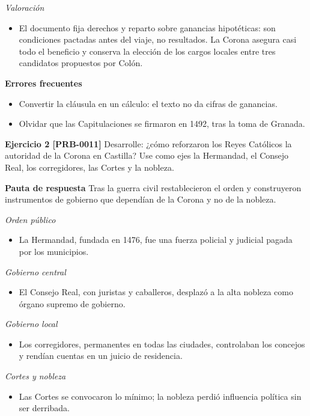 \documentclass{book}
\begin{document}
\noindent\textit{Valoración}
\begin{itemize}
\item El documento fija derechos y reparto sobre ganancias hipotéticas: son condiciones pactadas antes del viaje, no resultados. La Corona asegura casi todo el beneficio y conserva la elección de los cargos locales entre tres candidatos propuestos por Colón.
\end{itemize}

\noindent\textbf{Errores frecuentes}
\begin{itemize}
\item Convertir la cláusula en un cálculo: el texto no da cifras de ganancias.
\item Olvidar que las Capitulaciones se firmaron en 1492, tras la toma de Granada.
\end{itemize}

\noindent\textbf{Ejercicio 2 [PRB-0011]}
Desarrolle: ¿cómo reforzaron los Reyes Católicos la autoridad de la Corona en Castilla? Use como ejes la Hermandad, el Consejo Real, los corregidores, las Cortes y la nobleza.


\noindent\textbf{Pauta de respuesta}
Tras la guerra civil restablecieron el orden y construyeron instrumentos de gobierno que dependían de la Corona y no de la nobleza.


\noindent\textit{Orden público}
\begin{itemize}
\item La Hermandad, fundada en 1476, fue una fuerza policial y judicial pagada por los municipios.
\end{itemize}

\noindent\textit{Gobierno central}
\begin{itemize}
\item El Consejo Real, con juristas y caballeros, desplazó a la alta nobleza como órgano supremo de gobierno.
\end{itemize}

\noindent\textit{Gobierno local}
\begin{itemize}
\item Los corregidores, permanentes en todas las ciudades, controlaban los concejos y rendían cuentas en un juicio de residencia.
\end{itemize}

\noindent\textit{Cortes y nobleza}
\begin{itemize}
\item Las Cortes se convocaron lo mínimo; la nobleza perdió influencia política sin ser derribada.
\end{itemize}
\end{document}
